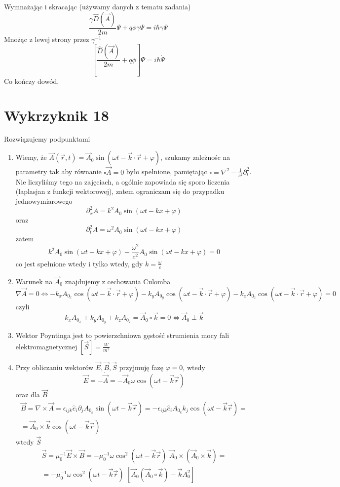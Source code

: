 \documentclass[a4paper,12pt]{article}
\begin{document}
Wymnażając i skracając (używamy danych z tematu zadania)
\begin{equation*}
  \frac{\gamma\hat{D}(\vec{A})}{2m}\Psi + q\phi \gamma \Psi = i\hbar \gamma
  \dot{\Psi}
\end{equation*}
Mnożąc z lewej strony przez $\gamma^{-1}$
\begin{equation*}
  \left[ \frac{\hat{D}(\vec{A})}{2m} + q\phi \right]  \Psi = i\hbar 
  \dot{\Psi}
\end{equation*}
Co kończy dowód.

\section{Wykrzyknik 18}
	Rozwiązujemy podpunktami
	\begin{enumerate}
		\item Wiemy, że $\vec{A}(\vec{r},t) = \vec{A}_0 \sin(\omega t - \vec{k}\cdot\vec{r}+\varphi)$, szukamy zależnośc na parametry tak aby
		równanie $\square\vec{A}=0$ było spełnione, pamiętając $\square = \nabla^2 - \frac{1}{c^2}\partial_t^2$.\\
		Nie liczyliśmy tego na zajęciach, a ogólnie zapowiada się sporo liczenia (laplasjan z funkcji wektorowej), zatem ograniczam się do przypadku jednowymiarowego
		$$
			\partial_x^2 A = k^2 A_0 \sin(\omega t - kx +\varphi)
		$$
		oraz
		$$
			\partial_t^2 A = \omega^2 A_0\sin(\omega t - kx+\varphi)
		$$
		zatem 
		$$
			 k^2 A_0 \sin(\omega t - kx +\varphi) - \frac{\omega^2}{c^2}A_0\sin(\omega t - kx+\varphi) = 0 
		$$
		co jest spełnione wtedy i tylko wtedy, gdy $k = \frac{\omega}{c}$
		\item Warunek na $\vec{A}_0$ znajdujemy z cechowania Culomba
		$$
			\nabla \vec{A} = 0 \Leftrightarrow -k_xA_{0_x} \cos(\omega t - \vec{k}\cdot\vec{r}+\varphi) - k_yA_{0_y}\cos(\omega t - \vec{k}\cdot\vec{r}+\varphi)
			-k_z A_{0_z} \cos(\omega t - \vec{k}\cdot\vec{r}+\varphi) = 0 
		$$
		czyli 
		$$
			k_xA_{0_x} + k_yA_{0_y} + k_zA_{0_z} = \vec{A}_0 \circ \vec{k} = 0  \Leftrightarrow \vec{A}_0 \perp \vec{k}
		$$
		\item Wektor Poyntinga jest to powierzchniowa gęstość strumienia mocy fali elektromagnetycznej $[\vec{S}] = \frac{W}{m^2}$
		\item Przy obliczaniu wektorów $\vec{E},\vec{B},\vec{S}$ przyjmuję fazę $\varphi =0$, wtedy
		$$
			\vec{E} = -\dot{\vec{A}} = -\vec{A}_0\omega\cos(\omega t -\vec{k}\vec{r})
		$$
		oraz dla $\vec{B}$
		$$
		\begin{array}{l}
			\vec{B} = \nabla\times\vec{A} = \epsilon_{ijk}\hat{e}_i\partial_j A_{0_k}\sin(\omega t-\vec{k}\vec{r}) = -\epsilon_{ijk}\hat{e}_i A_{0_k}k_j\cos(\omega t-\vec{k}\vec{r}) =\\
			=\vec{A}_0\times\vec{k}\cos(\omega t-\vec{k}\vec{r})
		\end{array}
		$$
		wtedy $\vec{S}$
		$$
		\begin{array}{l}
			\vec{S}=\mu_0^{-1}\vec{E}\times\vec{B} = -\mu_0^{-1}\omega\cos^2(\omega t-\vec{k}\vec{r})\,\,\vec{A}_0\times(\vec{A}_0\times\vec{k}) =\\
			= -\mu_0^{-1}\omega\cos^2(\omega t-\vec{k}\vec{r})\,\, \left[\vec{A}_0(\vec{A}_0\circ\vec{k})-\vec{k}A_0^2\right]
		\end{array}
		$$
	\end{enumerate}
\end{document}
